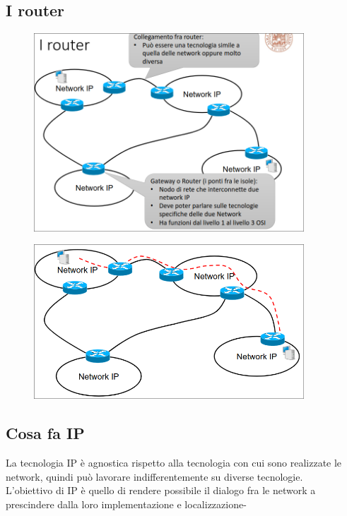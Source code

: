 \documentclass{report}
\begin{document}
                \subsection{I router}
                     \begin{figure}[H]
                    \includegraphics[width=0.9\textwidth]{1/router.png}
                \end{figure} \begin{figure}[H]
                    \includegraphics[width=0.9\textwidth]{1/router2.png}
                \end{figure}
                \subsection{Cosa fa IP}
                    La tecnologia IP è agnostica rispetto alla tecnologia con cui sono realizzate le network, quindi può lavorare indifferentemente su diverse tecnologie.
                    \\
                    L'obiettivo di IP è quello di rendere possibile il dialogo fra le network a prescindere dalla loro implementazione e localizzazione-
\end{document}
